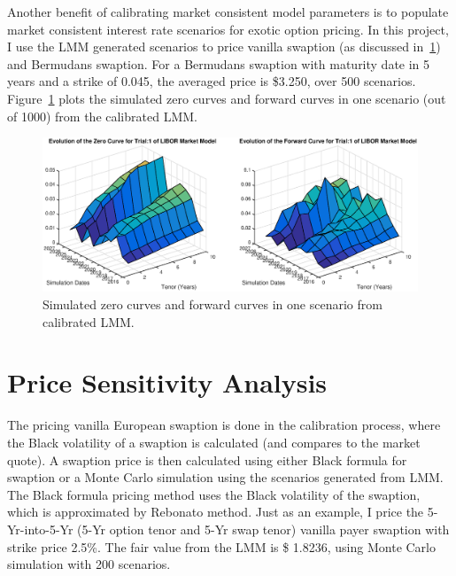 Another benefit of calibrating market consistent model parameters is to populate market consistent interest rate scenarios for exotic option pricing. In this project, I use the LMM generated scenarios to price vanilla swaption (as discussed in~\ref{chpt::market_risk}) and Bermudans swaption. For a Bermudans swaption with maturity date in 5 years and a strike of 0.045, the averaged price is \$3.250, over 500 scenarios. Figure~\ref{fig::sim_zero_forward} plots the simulated zero curves and forward curves in one scenario (out of 1000) from the calibrated LMM.

\begin{center}
  \begin{figure}
  \centering
      \includegraphics[scale=0.4]{sim_zero_forward.eps}
      \caption{Simulated zero curves and forward curves in one scenario from calibrated LMM.}\label{fig::sim_zero_forward}
  \end{figure}
\end{center}

\section{Price Sensitivity Analysis} \label{chpt::market_risk}
The pricing vanilla European swaption is done in the calibration process, where the Black volatility of a swaption is calculated (and compares to the market quote). A swaption price is then calculated using either Black formula for swaption or a Monte Carlo simulation using the scenarios generated from LMM. The Black formula pricing method uses the Black volatility of the swaption, which is approximated by Rebonato method. Just as an example, I price the 5-Yr-into-5-Yr (5-Yr option tenor and 5-Yr swap tenor) vanilla payer swaption with strike price 2.5\%. The fair value from the LMM is \$ 1.8236, using Monte Carlo simulation with 200 scenarios.

